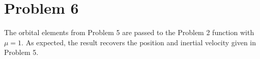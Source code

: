 \section{Problem 6}
\label{sec:problem6}

The orbital elements from Problem 5 are passed to the Problem 2 function with $\mu=1$. As expected, the result recovers the position and inertial velocity given in Problem 5.


\FloatBarrier
